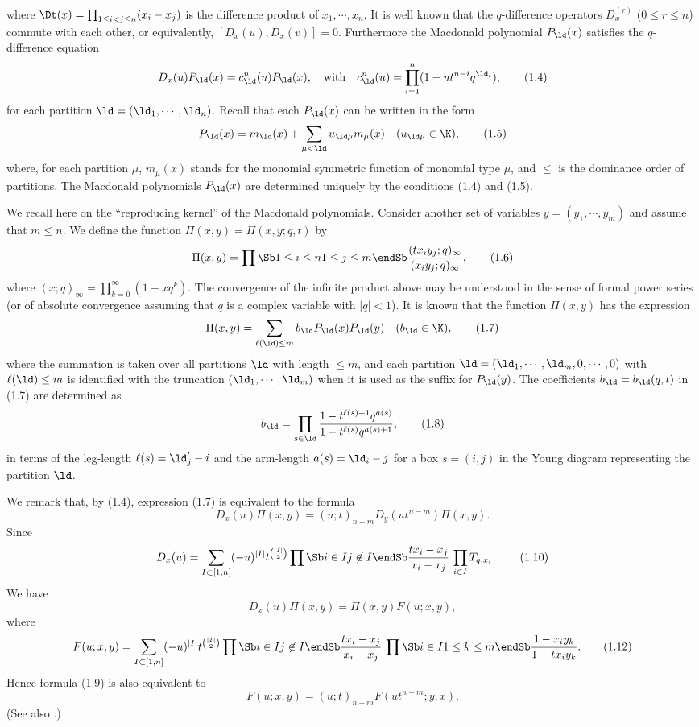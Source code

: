 where $\Dt(x)=\prod_{1\le i<j\le n}(x_i-x_j)$ is the difference product 
of $x_1,\cdots,x_n$. 
It is well known that the $q$-difference operators $D_x^{(r)}$ ($0\le r\le n$) 
commute with each other, or equivalently, $[D_x(u), D_x(v)]=0$. 
Furthermore the Macdonald polynomial $P_{\ld}(x)$ satisfies the 
$q$-difference equation
$$
D_x(u) P_{\ld}(x)=c^n_\ld(u) P_{\ld}(x), \quad\text{with}\quad 
c^n_\ld(u)=\prod_{i=1}^n (1-ut^{n-i}q^{\ld_i}), 
\tag{1.4}
$$
for each partition $\ld=(\ld_1,\cdots,\ld_n)$. 
Recall that each $P_\ld(x)$ can be written in the 
form
$$
P_\ld(x)=m_{\ld}(x) + \sum_{\mu<\ld} u_{\ld\mu} m_{\mu}(x)\quad(u_{\ld\mu}\in \K),
\tag{1.5}
$$
where, for each partition $\mu$, $m_{\mu}(x)$ stands for the monomial 
symmetric function of monomial type $\mu$, and $\le$ is the dominance 
order of partitions. 
The Macdonald polynomials $P_\ld(x)$ are determined uniquely by the conditions 
(1.4) and (1.5). 
\par
We recall here on the ``reproducing kernel'' of the Macdonald 
polynomials. 
Consider another set of variables $y=(y_1,\cdots,y_m)$ and assume that 
$m\le n$.  
We define the function $\Pi(x,y)=\Pi(x,y;q,t)$ by
$$
\Pi(x,y)=\prod\Sb 1\le i\le n\\ 1\le j\le m\endSb
\frac{(tx_iy_j;q)_\infty}{(x_iy_j;q)_\infty}, 
\tag{1.6}
$$
where $(x;q)_\infty=\prod_{k=0}^\infty (1-xq^k)$. 
The convergence of the infinite product above may be 
understood in the sense of formal power series
(or of absolute convergence assuming that 
$q$ is a complex variable with $|q|<1$). 
It is known that the function $\Pi(x,y)$ has the expression 
$$
\Pi(x,y)=\sum_{\ell(\ld)\le m} b_\ld P_\ld(x) P_\ld(y) \quad(b_\ld\in \K),
\tag{1.7}
$$
where the summation is taken over all partitions $\ld$ with length $\le m$, 
and each partition $\ld=(\ld_1,\cdots,\ld_m,0,\cdots,0)$ with 
$\ell(\ld)\le m$
is identified with the truncation $(\ld_1,\cdots,\ld_m)$ when it is used as the 
suffix for $P_\ld(y)$. 
The coefficients $b_\ld=b_\ld(q,t)$ in (1.7) are determined as 
$$
b_\ld=\prod_{s\in\ld} 
\frac{1-t^{\ell(s)+1}q^{a(s)}}{1-t^{\ell(s)}q^{a(s)+1}},
\tag{1.8}
$$
in terms of the leg-length $\ell(s)=\ld'_j-i$ and the arm-length 
$a(s)=\ld_i-j$ 
for a box $s=(i,j)$ in the Young diagram representing the 
partition $\ld$. 
\par
We remark that, by (1.4), expression (1.7) is equivalent to the formula
$$
D_x(u)\Pi(x,y)=(u;t)_{n-m} D_y(u t^{n-m}) \Pi(x,y). 
\tag{1.9}
$$
Since 
$$
D_x(u)=\sum_{I\subset[1,n]} (-u)^{|I|} t^{\binom{|I|}{2}}
\prod\Sb i\in I\\ j\not\in I\endSb
\frac{tx_i-x_j}{x_i-x_j} \, \prod_{i\in I}T_{q,x_i}, 
\tag{1.10}
$$
We have 
$$
D_x(u) \Pi(x,y) = \Pi(x,y) F(u;x,y),
\tag{1.11}
$$
where
$$
F(u;x,y)=\sum_{I\subset[1,n]} (-u)^{|I|} t^{\binom{|I|}{2}}
\prod\Sb i\in I\\ j\not\in I\endSb 
\frac{tx_i-x_j}{x_i-x_j} \, 
\prod\Sb i\in I\\ 1\le k\le m\endSb
\frac{1-x_iy_k}{1-tx_iy_k}.
\tag{1.12}
$$
Hence formula (1.9) is also equivalent to 
$$
F(u;x,y)=(u;t)_{n-m} F(ut^{n-m};y,x). 
\tag{1.13}
$$
(See also \cite{MN1}.)
\par\newpage
